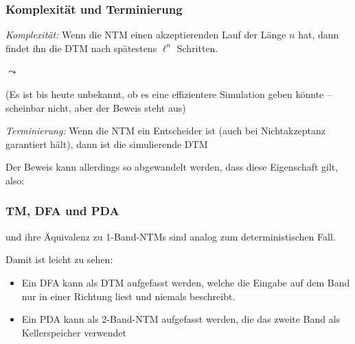 \documentclass[onlymath]{beamer}
\begin{document}
\begin{frame}[t]\frametitle{Komplexität und Terminierung}


\emph{Komplexität:}
Wenn die NTM einen akzeptierenden Lauf der Länge $n$ hat, dann findet ihn die DTM nach
spätestens $\ell^n$ Schritten.
\medskip

$\leadsto$ 

(Es ist bis heute unbekannt, ob es eine effizientere Simulation geben könnte -- scheinbar nicht, aber der Beweis steht aus)\pause\bigskip

\emph{Terminierung:}
Wenn die NTM ein Entscheider ist (auch bei Nichtakzeptanz garantiert hält), dann ist die
simulierende DTM \ghost{\ldots}\\\pause {}
\medskip

Der Beweis kann allerdings so abgewandelt werden, dass diese Eigenschaft gilt, also:


\end{frame}

\begin{frame}\frametitle{TM, DFA und PDA}

 und ihre Äquivalenz zu 1-Band-NTMs sind analog zum deterministischen Fall.
\medskip

Damit ist leicht zu sehen:
\begin{itemize}
\item Ein DFA kann als DTM aufgefasst werden, welche die Eingabe auf dem Band nur in einer Richtung
liest und niemals beschreibt.
\item Ein PDA kann als 2-Band-NTM aufgefasst werden, die das zweite Band als Kellerspeicher verwendet
\end{itemize}

\end{frame}


% 
\end{document}
